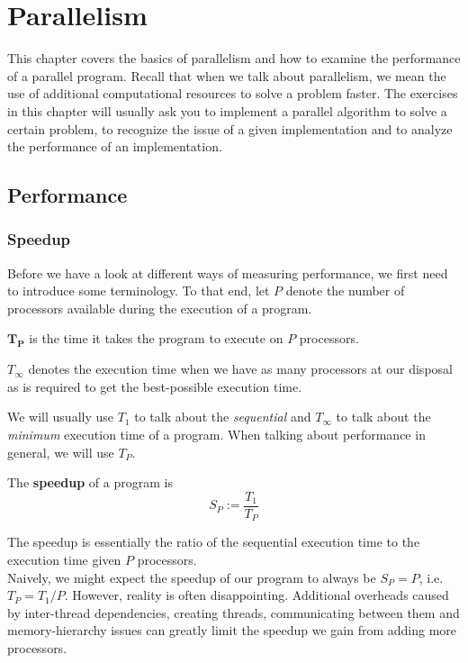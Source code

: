 \documentclass[main.tex]{subfiles}
\begin{document}
\addtolength{\tabcolsep}{-2pt}

\section{Parallelism} \label{Parallelism}
This chapter covers the basics of parallelism and how to examine the performance of a parallel program. Recall that when we talk about parallelism, we mean the use of additional computational resources to solve a problem faster. The exercises in this chapter will usually ask you to implement a parallel algorithm to solve a certain problem, to recognize the issue of a given implementation and to analyze the performance of an implementation. 
\subsection{Performance} \label{Performance}
\subsubsection{Speedup} \label{Speedup}
Before we have a look at different ways of measuring performance, we first need to introduce some terminology. To that end, let $P$ denote the number of processors available during the execution of a program.
\begin{definition} 
$\mathbf{T_P}$ is the time it takes the program to execute on $P$ processors.
\begin{remark}
$T_\infty$ denotes the execution time when we have as many processors at our disposal as is required to get the best-possible execution time.
\end{remark}
\end{definition}
We will usually use $T_1$ to talk about the \textit{sequential} and $T_\infty$ to talk about the \textit{minimum} execution time of a program. When talking about performance in general, we will use $T_P$.
\begin{definition}
The \textbf{speedup} of a program is
\begin{equation*}
    S_P := \frac{T_1}{T_P}
\end{equation*}
\end{definition}
The speedup is essentially the ratio of the sequential execution time to the execution time given $P$ processors.\\
Naively, we might expect the speedup of our program to always be $S_P = P$, i.e. $T_P = T_1 / P$. However, reality is often disappointing. Additional overheads caused by inter-thread dependencies, creating threads, communicating between them and memory-hierarchy issues can greatly limit the speedup we gain from adding more processors.
\end{document}
